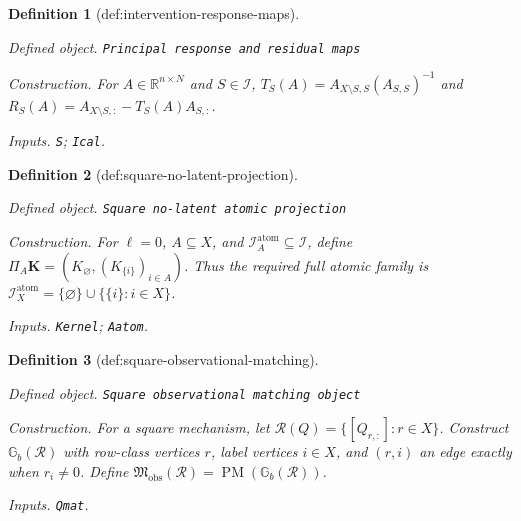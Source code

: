 \documentclass{article}
\newtheorem{definition}{Definition}
\begin{document}
\begin{definition}[def:intervention-response-maps]\label{def:intervention-response-maps}
\par\smallskip\noindent\emph{Defined object.} \texttt{Principal response and residual maps}
\par\smallskip\noindent\emph{Construction.} For \(A\in\mathbb R^{n\times N}\) and \(S\in\mathcal I\), \(T_S(A)=A_{X\setminus S,S}(A_{S,S})^{-1}\) and \(R_S(A)=A_{X\setminus S,:}-T_S(A)A_{S,:}\).
\par\smallskip\noindent\emph{Inputs.} \texttt{S}; \texttt{Ical}.
\end{definition}

\begin{definition}[def:square-no-latent-projection]\label{def:square-no-latent-projection}
\par\smallskip\noindent\emph{Defined object.} \texttt{Square no-\allowbreak{}latent atomic projection}
\par\smallskip\noindent\emph{Construction.} For \(\ell=0\), \(A\subseteq X\), and \(\mathcal I_A^{\mathrm{atom}}\subseteq\mathcal I\), define \(\Pi_A\mathbf K=(K_{\varnothing},(K_{\{i\}})_{i\in A})\). Thus the required full atomic family is \(\mathcal I_X^{\mathrm{atom}}=\{\varnothing\}\cup\{\{i\}:i\in X\}\).
\par\smallskip\noindent\emph{Inputs.} \texttt{Kernel}; \texttt{Aatom}.
\end{definition}

\begin{definition}[def:square-observational-matching]\label{def:square-observational-matching}
\par\smallskip\noindent\emph{Defined object.} \texttt{Square observational matching object}
\par\smallskip\noindent\emph{Construction.} For a square mechanism, let \(\mathscr R(Q)=\{[Q_{r,:}]:r\in X\}\). Construct \(\mathbb G_b(\mathscr R)\) with row-class vertices \(r\), label vertices \(i\in X\), and \((r,i)\) an edge exactly when \(r_i\ne0\). Define \(\mathfrak M_{\mathrm{obs}}(\mathscr R)=\operatorname{PM}(\mathbb G_b(\mathscr R))\).
\par\smallskip\noindent\emph{Inputs.} \texttt{Qmat}.
\end{definition}
\end{document}
